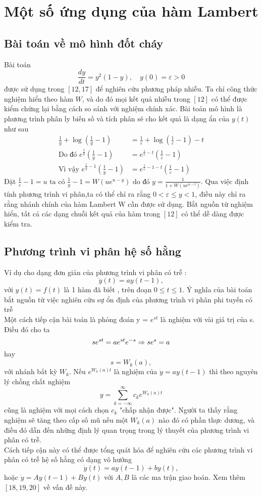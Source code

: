 \section{Một số ứng dụng của hàm Lambert}
\subsection{Bài toán về mô hình đốt cháy}
 Bài toán 
$$ \frac{dy}{dt} = y^{2}(1-y),\quad y(0) = \varepsilon > 0 $$ được sử dụng trong $[12,17]$ để nghiên cứu phương pháp nhiễu. Ta chỉ công thức nghiệm hiển theo hàm $W$, và do đó mọi kết quả nhiễu trong $[12]$ có thể được kiểm chứng lại bằng cách so sánh với nghiệm chính xác. Bài toán mô hình là phương trình phân ly biến số và tích phân sẽ cho kết quả là dạng ẩn của $y(t)$ như sau
\begin{align*} \frac{1}{y} + \log (\frac{1}{y} -1 ) &= \frac{1}{\varepsilon} + \log (\frac{1}{\varepsilon}  - 1) - t  \\
\mbox{Do đó } e^{\frac{1}{y}}(\frac{1}{y} - 1) &= e^{\frac{1}{\varepsilon}-t}(\frac{1}{\varepsilon}-1)  \\
\mbox{Vì vậy } e^{\frac{1}{y}-1}(\frac{1}{y}-1) &= e^{\frac{1}{\varepsilon}-1-t}(\frac{1}{\varepsilon}-1) 
\end{align*}
Đặt $\frac{1}{\varepsilon} - 1 = u \mbox{ ta có } \frac{1}{y} - 1 = W(ue^{u-y}) \mbox{ do đó } y = \frac{1}{1+W(ue^{u-t})}$. Qua việc định tính phương trình vi phân,ta có thể chỉ ra rằng $0 < \varepsilon \le y < 1$, điều này chỉ ra rằng nhánh chính của hàm Lambert W cần được sử dụng. Bắt nguồn từ nghiệm hiển, tất cả các dạng chuỗi kết quả của hàm trong $[12]$ có thể dễ dàng được kiểm tra.
\subsection{Phương trình vi phân hệ số hằng}
Ví dụ cho dạng đơn giản của phương trình vi phân có trễ :
$$ \dot{y}(t) = ay(t-1), $$ với $y(t) = f(t)$ là 1 hàm đã biết , trên đoạn $0 \le t \le 1$. Ý nghĩa của bài toán bắt nguồn từ việc nghiên cứu sự ổn định của phương trình vi phân phi tuyến có trễ\\
Một cách tiếp cận bài toán là phỏng đoán y = $e^{st}$ là nghiệm với vài giá trị của s. Điều đó cho ta
$$ se^{st} = ae^{st}e^{-s} \\ \Rightarrow se^{s} = a $$ hay $$ s =  W_k(a) , $$  với nhánh bất kỳ $W_k$. 
Nếu $e^{W_k(a)t}$ là nghiệm của $ \dot{y} = ay(t-1) $ thì theo nguyên lý chồng chất nghiệm
$$ y = \displaystyle \sum_{k=-\infty}^{\infty}{c_ke^{W_k(a)t}}$$ cũng là nghiệm với mọi cách chọn $c_k$ "chấp nhận được".  Người ta thấy rằng nghiệm sẽ tăng theo cấp số mũ nếu một $W_k(a)$ nào đó có phần thực dương, và điều đó dẫn đến những định lý quan trọng trong lý thuyết của phương trình vi phân có trễ.\\
Cách tiếp cận này có thể được tổng quát hóa để nghiên cứu các phương trình vi phân có trễ hệ số hằng có dạng vô hướng
$$ \dot{y}(t) = ay(t-1) + by(t), $$ 
hoặc $ \dot{y} = Ay(t-1) + By(t)$ với $A, B$ là các ma trận giao hoán. Xem thêm $[18,19,20]$ về vấn đề này.
 
